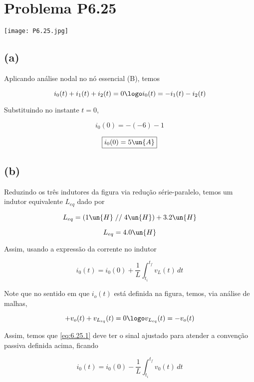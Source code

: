 
\section*{Problema P6.25}

\renewcommand*\thesection{6.25}

\begin{center}
    \texttt{[image: P6.25.jpg]}
\end{center}

\subsection*{(a)}

Aplicando análise nodal no nó essencial (B), temos

\[ i_0(t) + i_1(t) + i_2(t) = 0 \logo i_0(t) = - i_1(t) - i_2(t)  \]

Substituindo no instante $t=0$,

\[ i_0(0) = -(-6) - 1   \]

\[ \boxed{i_0(0) = 5 \un{A}}  \]

\subsection*{(b)}

Reduzindo os três indutores da figura via redução série-paralelo, temos um indutor equivalente $L_{eq}$ dado por 

\[ L_{eq} = (1\un{H} \;//\; 4\un{H}) + 3.2\un{H}  \]

\[ L_{eq} = 4.0\un{H}  \]

Assim, usando a expressão da corrente no indutor

\begin{equation}\label{eq:6.25.1}
    i_0(t) = i_0(0) + \frac{1}{L} \int_{t_i}^{t_f} v_L(t) \,dt
\end{equation}

Note que no sentido em que $i_o(t)$ está definida na figura, temos, via análise de malhas,

\[+v_o(t) + v_{L_{eq}}(t) = 0  \logo  v_{L_{eq}}(t) = - v_o(t) \]

Assim, temos que \eqref{eq:6.25.1} deve ter o sinal ajustado para atender a convenção passiva definida acima, ficando

\begin{equation}\label{eq:6.25.2}
    i_0(t) = i_0(0) - \frac{1}{L} \int_{t_i}^{t_f} v_0(t) \,dt
\end{equation}

